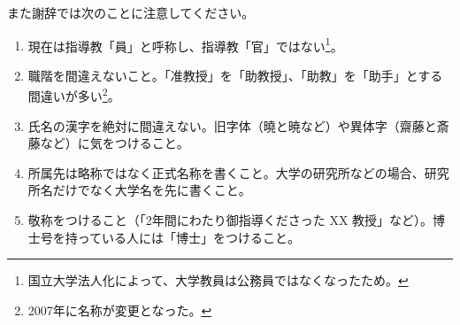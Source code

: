 また謝辞では次のことに注意してください。

\begin{enumerate}
\item 現在は指導教「員」と呼称し、指導教「官」ではない\footnote{国立大学法人化によって、大学教員は公務員ではなくなったため。}。
\item 職階を間違えないこと。「准教授」を「助教授」、「助教」を「助手」とする間違いが多い\footnote{2007年に名称が変更となった。}。
\item 氏名の漢字を絶対に間違えない。旧字体（曉と暁など）や異体字（齋藤と斎藤など）に気をつけること。
\item 所属先は略称ではなく正式名称を書くこと。大学の研究所などの場合、研究所名だけでなく大学名を先に書くこと。
\item 敬称をつけること（「2年間にわたり御指導くださった XX 教授」など）。博士号を持っている人には「博士」をつけること。
\end{enumerate}
